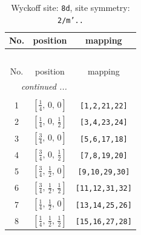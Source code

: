 \documentclass[fleqn,8pt]{jsarticle}
\begin{document}
\begin{longtable}{ccc}
\caption{Wyckoff site: {\tt 8d}, site symmetry: {\tt 2/m'..}}
 \\
 \hline \hline
No. & position & mapping \\ \hline \endfirsthead

\multicolumn{2}{l}{\tablename\ \thetable{}} \\
 \hline \hline
No. & position & mapping \\ \hline \endhead

 \hline \hline
\multicolumn{2}{r}{\footnotesize\it continued ...} \\ \endfoot

 \hline \hline
\multicolumn{2}{r}{} \\ \endlastfoot

1 & $\left[ \frac{1}{4},\, 0,\, 0 \right]$ & {\tt [1,2,21,22]} \\ \hline
2 & $\left[ \frac{1}{4},\, 0,\, \frac{1}{2} \right]$ & {\tt [3,4,23,24]} \\ \hline
3 & $\left[ \frac{3}{4},\, 0,\, 0 \right]$ & {\tt [5,6,17,18]} \\ \hline
4 & $\left[ \frac{3}{4},\, 0,\, \frac{1}{2} \right]$ & {\tt [7,8,19,20]} \\ \hline
5 & $\left[ \frac{3}{4},\, \frac{1}{2},\, 0 \right]$ & {\tt [9,10,29,30]} \\ \hline
6 & $\left[ \frac{3}{4},\, \frac{1}{2},\, \frac{1}{2} \right]$ & {\tt [11,12,31,32]} \\ \hline
7 & $\left[ \frac{1}{4},\, \frac{1}{2},\, 0 \right]$ & {\tt [13,14,25,26]} \\ \hline
8 & $\left[ \frac{1}{4},\, \frac{1}{2},\, \frac{1}{2} \right]$ & {\tt [15,16,27,28]} \\
\end{longtable}
\renewcommand{\arraystretch}{1.2}
\end{document}
